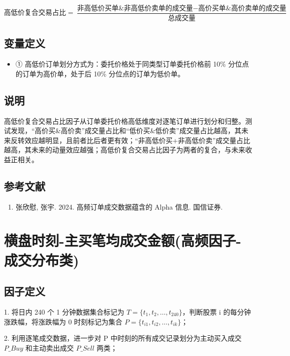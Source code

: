 \documentclass{article}
\begin{document}
\begin{equation}
    \text{高低价复合交易占比} = \frac{\text{非高低价买单\&非高低价卖单的成交量} - \text{高价买单\&高价卖单的成交量}}{\text{总成交量}}
\end{equation}

\subsection{变量定义}
\begin{itemize}
    \item ① 高低价订单划分方式为：委托价格处于同类型订单委托价格前 10\% 分位点的订单为高价单，处于后 10\% 分位点的订单为低价单。
\end{itemize}

\subsection{说明}
高低价复合交易占比因子从订单委托价格高低维度对逐笔订单进行划分和归整。测试发现，“高价买\&高价卖”成交量占比和“低价买\&低价卖”成交量占比越高，其未来反转效应越明显，且前者比后者更有效；“非高低价买+非高低价卖”成交量占比越高，其未来的动量效应越强；高低价复合交易占比因子为两者的复合，与未来收益正相关。

\subsection{参考文献}
\begin{enumerate}
    \item 张欣慰, 张宇. 2024. 高频订单成交数据蕴含的 Alpha 信息. 国信证券.
\end{enumerate}

\section{横盘时刻-主买笔均成交金额(高频因子-成交分布类)}

\subsection{因子定义}

1. 将日内 240 个 1 分钟数据集合标记为 \( T = \{t_1, t_2, \dots, t_{240}\} \)，判断股票 i 的每分钟涨跌幅，将涨跌幅为 0 时刻标记为集合 \( P = \{t_{i1}, t_{i2}, \dots, t_{ik}\} \)；

2. 利用逐笔成交数据，进一步对 P 中时刻的所有成交记录划分为主动买入成交 \( P\_Buy \) 和主动卖出成交 \( P\_Sell \) 两类；
\end{document}
